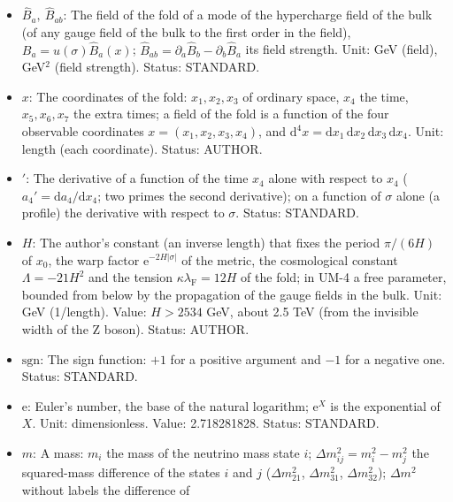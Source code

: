 \documentclass[
  10pt,
]{article}
\begin{document}
\begin{itemize}
  \(0 < z < \pi\); \(\sigma = 0\) is the fold \(z = \pi/2\),
  \(\sigma \to \mp\infty\) the tips \(z \to 0, \pi\); one period of
  \(x_0\) is the whole line \(-\infty < \sigma < \infty\). Unit: length.
  Status: DERIVED.
\item
  \(\hat B_a,\ \hat B_{ab}\): The field of the fold of a mode of the
  hypercharge field of the bulk (of any gauge field of the bulk to the
  first order in the field), \(B_a = u(\sigma)\hat B_a(x)\);
  \(\hat B_{ab} = \partial_a\hat B_b - \partial_b\hat B_a\) its field
  strength. Unit: GeV (field), GeV\(^2\) (field strength). Status:
  STANDARD.
\item
  \(x\): The coordinates of the fold: \(x_1, x_2, x_3\) of ordinary
  space, \(x_4\) the time, \(x_5, x_6, x_7\) the extra times; a field of
  the fold is a function of the four observable coordinates
  \(x = (x_1, x_2, x_3, x_4)\), and
  \(\mathrm{d}^4x = \mathrm{d}x_1\,\mathrm{d}x_2\,\mathrm{d}x_3\,\mathrm{d}x_4\).
  Unit: length (each coordinate). Status: AUTHOR.
\item
  \({}'\): The derivative of a function of the time \(x_4\) alone with
  respect to \(x_4\) (\(a_4' = \mathrm{d}a_4/\mathrm{d}x_4\); two primes
  the second derivative); on a function of \(\sigma\) alone (a profile)
  the derivative with respect to \(\sigma\). Status: STANDARD.
\item
  \(H\): The author's constant (an inverse length) that fixes the period
  \(\pi/(6H)\) of \(x_0\), the warp factor
  \(\mathrm{e}^{-2H\lvert\sigma\rvert}\) of the metric, the cosmological
  constant \(\Lambda = -21H^2\) and the tension
  \(\kappa\lambda_{\mathrm{F}} = 12H\) of the fold; in UM-4 a free
  parameter, bounded from below by the propagation of the gauge fields
  in the bulk. Unit: GeV (1/length). Value: \(H > 2534\) GeV, about 2.5
  TeV (from the invisible width of the Z boson). Status: AUTHOR.
\item
  \(\mathrm{sgn}\): The sign function: \(+1\) for a positive argument
  and \(-1\) for a negative one. Status: STANDARD.
\item
  \(\mathrm{e}\): Euler's number, the base of the natural logarithm;
  \(\mathrm{e}^{X}\) is the exponential of \(X\). Unit: dimensionless.
  Value: 2.718281828. Status: STANDARD.
\item
  \(m\): A mass: \(m_i\) the mass of the neutrino mass state \(i\);
  \(\Delta m_{ij}^2 = m_i^2 - m_j^2\) the squared-mass difference of the
  states \(i\) and \(j\) (\(\Delta m_{21}^2\), \(\Delta m_{31}^2\),
  \(\Delta m_{32}^2\)); \(\Delta m^2\) without labels the difference of

\end{itemize}
\end{document}

